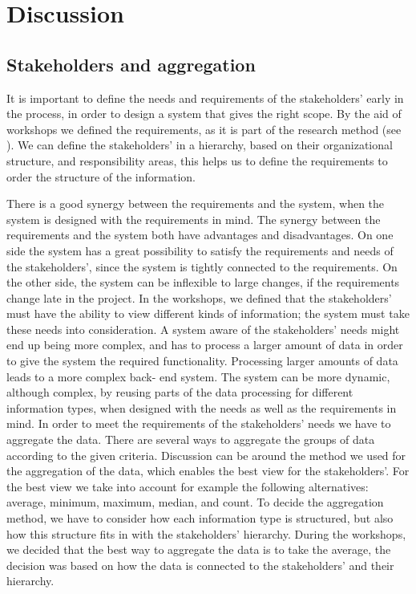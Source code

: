 \chapter{Discussion}
\label{chapter:discussion}

\section{Stakeholders and aggregation} %
\label{sec:discussion_stakeholders'_and_aggregation}
It is important to define the needs and requirements of the stakeholders' early 
in the process, in order to design a system that gives the right scope. By the 
aid of workshops we defined the requirements, as it is part of the research 
method (see ). We can define the stakeholders' in a 
hierarchy, based on their organizational structure, and responsibility areas, 
this helps us to define the requirements to order the structure of the 
information.

There is a good synergy between the requirements and the system, when the 
system is designed with the requirements in mind. The synergy between the 
requirements and the system both have advantages and disadvantages. On one 
side the system has a great possibility to satisfy the requirements and needs 
of the stakeholders', since the system is tightly connected to the 
requirements. On the other side, the system can be inflexible to large 
changes, if the requirements change late in the project. In the workshops, we 
defined that the stakeholders' must have the ability to view different kinds of 
information; the system must take these needs into consideration. A system 
aware of the stakeholders' needs might end up being more complex, and has to 
process a larger amount of data in order to give the system the required 
functionality. Processing larger amounts of data leads to a more complex back-
end system. The system can be more dynamic, although complex, by reusing parts 
of the data processing for different information types, when designed with the 
needs as well as the requirements in mind. In order to meet the requirements 
of the stakeholders' needs we have to aggregate the data. There are several 
ways to aggregate the groups of data according to the given criteria. 
Discussion can be around the method we used for the aggregation of the data, 
which enables the best view for the stakeholders'. For the best view we take 
into account for example the following alternatives: average, minimum, 
maximum, median, and count. To decide the aggregation method, we have to 
consider how each information type is structured, but also how this structure 
fits in with the stakeholders' hierarchy. During the workshops, we decided 
that the best way to aggregate the data is to take the average, the decision 
was based on how the data is connected to the stakeholders' and their
hierarchy.

